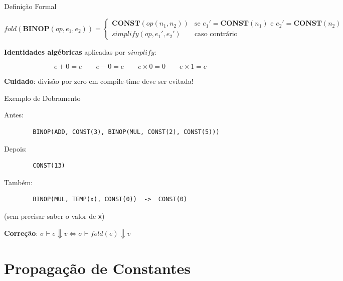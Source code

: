 \begin{frame}{Definição Formal}

    \[\mathit{fold}(\mathbf{BINOP}(\mathit{op}, e_1, e_2)) = \begin{cases}
    \mathbf{CONST}(\mathit{op}(n_1, n_2)) & \text{se } e_1' = \mathbf{CONST}(n_1) \text{ e } e_2' = \mathbf{CONST}(n_2) \\
    \mathit{simplify}(\mathit{op}, e_1', e_2') & \text{caso contrário}
\end{cases}\]

\textbf{Identidades algébricas} aplicadas por \(\mathit{simplify}\):

\[e + 0 = e \qquad e - 0 = e \qquad e \times 0 = 0 \qquad e \times 1 = e\]

\textbf{Cuidado}: divisão por zero em compile-time deve ser evitada!
\end{frame}

\begin{frame}[fragile]{Exemplo de Dobramento}

    Antes:

    \begin{lstlisting}
        BINOP(ADD, CONST(3), BINOP(MUL, CONST(2), CONST(5)))
    \end{lstlisting}

    Depois:

    \begin{lstlisting}
        CONST(13)
    \end{lstlisting}

    Também:

    \begin{lstlisting}
        BINOP(MUL, TEMP(x), CONST(0))  ->  CONST(0)
    \end{lstlisting}

    (sem precisar saber o valor de \texttt{x})

    \textbf{Correção}:
    \(\sigma \vdash e \Downarrow v \iff \sigma \vdash \mathit{fold}(e) \Downarrow v\)
\end{frame}


\section{Propagação de
Constantes}\label{propagauxe7uxe3o-de-constantes}

